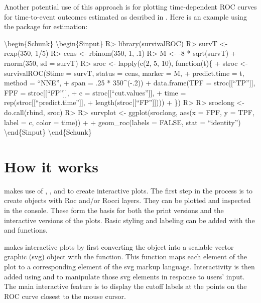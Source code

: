 \documentclass[codesnippet]{jss}
\begin{document}
Another potential use of this approach is for plotting time-dependent
ROC curves for time-to-event outcomes estimated as desribed in
\citep{heagerty2000time}. Here is an example using the 
package \citep{survroc} for estimation:

\textbackslash{}begin\{Schunk\} \textbackslash{}begin\{Sinput\}
R\textgreater{} library(survivalROC) R\textgreater{} survT \textless{}-
rexp(350, 1/5) R\textgreater{} cens \textless{}- rbinom(350, 1, .1)
R\textgreater{} M \textless{}- -8 * sqrt(survT) + rnorm(350, sd = survT)
R\textgreater{} sroc \textless{}- lapply(c(2, 5, 10), function(t)\{ +
stroc \textless{}- survivalROC(Stime = survT, status = cens, marker = M,
+ predict.time = t, method = ``NNE'', + span = .25 * 350\^{}(-.2)) +
data.frame(TPF = stroc{[}{[}``TP''{]}{]}, FPF = stroc{[}{[}``FP''{]}{]},
+ c = stroc{[}{[}``cut.values''{]}{]}, + time =
rep(stroc{[}{[}``predict.time''{]}{]}, +
length(stroc{[}{[}``FP''{]}{]}))) + \}) R\textgreater{} R\textgreater{}
sroclong \textless{}- do.call(rbind, sroc) R\textgreater{}
R\textgreater{} survplot \textless{}- ggplot(sroclong, aes(x = FPF, y =
TPF, label = c, color = time)) + + geom\_roc(labels = FALSE, stat =
``identity'') \textbackslash{}end\{Sinput\}
\textbackslash{}end\{Schunk\}

\section{How it works}\label{how-it-works}

 makes use of  \citep{ggplot2}, 
\citep{gridsvg}, and  \citep{bostock2011d3} to create
interactive plots. The first step in the process is to create
 objects with Roc and/or Rocci layers. They can be plotted
and inspected in the  console. These form the basis for both
the print versions and the interactive versions of the plots. Basic
styling and labeling can be added with the  and
 functions.

 makes interactive plots by first converting the
 object into a scalable vector graphic (svg) object with
the  function. This function maps each
element of the plot to a corresponding element of the svg markup
language. Interactivity is then added using  and
 to manipulate those svg elements in response to
users' input. The main interactive feature is to display the cutoff
labels at the points on the ROC curve closest to the mouse cursor.
\end{document}
